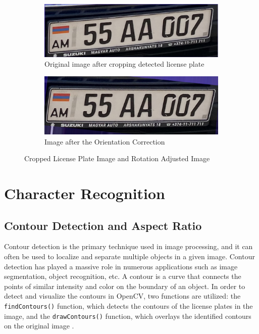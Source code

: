 \documentclass[conference]{IEEEtran}
\begin{document}
\begin{figure}[ht]
  \centering
  \begin{subfigure}[b]{0.45\linewidth}
    \includegraphics[width=\linewidth]{images/Picture26.png}
    \caption{Original image after cropping detected license plate}
  \end{subfigure}
  \begin{subfigure}[b]{0.45\linewidth}
    \includegraphics[width=\linewidth]{images/Picture27.png}
    \caption{Image after the Orientation Correction}
  \end{subfigure}
  \caption{Cropped License Plate Image and Rotation Adjusted Image}
  \label{fig:combined7}
\end{figure}

\section{Character Recognition}
\subsection{Contour Detection and Aspect Ratio}

Contour detection is the primary technique used in image processing, and it can often be used to localize and separate multiple objects in a given image. Contour detection has played a massive role in numerous applications such as image segmentation, object recognition, etc. A contour is a curve that connects the points of similar intensity and color on the boundary of an object. In order to detect and visualize the contours in OpenCV, two functions are utilized: the \texttt{findContours()} function, which detects the contours of the license plates in the image, and the \texttt{drawContours()} function, which overlays the identified contours on the original image \cite{b18}.
\end{document}
